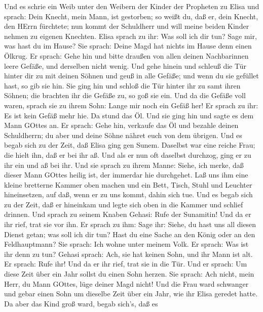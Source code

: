  Und es schrie ein Weib unter den Weibern der Kinder der
Propheten zu Elisa und sprach: Dein Knecht, mein Mann, ist gestorben; so
weißt du, daß er, dein Knecht, den HErrn fürchtete; nun kommt der
Schuldherr und will meine beiden Kinder nehmen zu eigenen Knechten.
 Elisa sprach zu ihr: Was soll ich dir tun? Sage mir, was
hast du im Hause? Sie sprach: Deine Magd hat nichts im Hause denn einen
Ölkrug.  Er sprach: Gehe hin und bitte draußen von allen
deinen Nachbarinnen leere Gefäße, und derselben nicht wenig.
 Und gehe hinein und schleuß die Tür hinter dir zu mit
deinen Söhnen und geuß in alle Gefäße; und wenn du sie gefüllet hast, so
gib sie hin.  Sie ging hin und schloß die Tür hinter ihr zu
samt ihren Söhnen; die brachten ihr die Gefäße zu, so goß sie ein.
 Und da die Gefäße voll waren, sprach sie zu ihrem Sohn:
Lange mir noch ein Gefäß her! Er sprach zu ihr: Es ist kein Gefäß mehr
hie. Da stund das Öl.  Und sie ging hin und sagte es dem
Mann GOttes an. Er sprach: Gehe hin, verkaufe das Öl und bezahle deinen
Schuldherrn; du aber und deine Söhne nähret euch von dem übrigen.
 Und es begab sich zu der Zeit, daß Elisa ging gen Sunem.
Daselbst war eine reiche Frau; die hielt ihn, daß er bei ihr aß. Und als
er nun oft daselbst durchzog, ging er zu ihr ein und aß bei ihr.
 Und sie sprach zu ihrem Manne: Siehe, ich merke, daß dieser
Mann GOttes heilig ist, der immerdar hie durchgehet.  Laß
uns ihm eine kleine bretterne Kammer oben machen und ein Bett, Tisch,
Stuhl und Leuchter hineinsetzen, auf daß, wenn er zu uns kommt, dahin
sich tue.  Und es begab sich zu der Zeit, daß er hineinkam
und legte sich oben in die Kammer und schlief drinnen.  Und
sprach zu seinem Knaben Gehasi: Rufe der Sunamitin! Und da er ihr rief,
trat sie vor ihn.  Er sprach zu ihm: Sage ihr: Siehe, du
hast uns all diesen Dienst getan; was soll ich dir tun? Hast du eine
Sache an den König oder an den Feldhauptmann? Sie sprach: Ich wohne
unter meinem Volk.  Er sprach: Was ist ihr denn zu tun?
Gehasi sprach: Ach, sie hat keinen Sohn, und ihr Mann ist alt.
 Er sprach: Rufe ihr! Und da er ihr rief, trat sie in die
Tür.  Und er sprach: Um diese Zeit über ein Jahr sollst du
einen Sohn herzen. Sie sprach: Ach nicht, mein Herr, du Mann GOttes,
lüge deiner Magd nicht!  Und die Frau ward schwanger und
gebar einen Sohn um dieselbe Zeit über ein Jahr, wie ihr Elisa geredet
hatte.  Da aber das Kind groß ward, begab sich's, daß es
